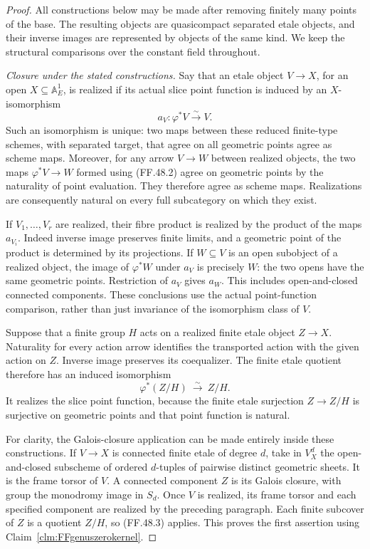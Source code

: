 \begin{proof}
All constructions below may be made after removing
finitely many points of the base. The resulting objects
are quasicompact separated etale objects, and their
inverse images are represented by objects of the same
kind. We keep the structural comparisons over the
constant field throughout.

\emph{Closure under the stated constructions.}
Say that an etale object \(V\to X\), for an open
\(X\subseteq\mathbb A^1_E\), is realized if its
actual slice point function is induced by an
\(X\)-isomorphism
\[
                       a_V:\varphi^*V\xrightarrow{\sim}V.
                                                        \tag{FF.48.2}
\]
Such an isomorphism is unique: two maps between these
reduced finite-type schemes, with separated target, that
agree on all geometric points agree as scheme maps.
Moreover, for any arrow \(V\to W\) between realized
objects, the two maps \(\varphi^*V\to W\) formed
using (FF.48.2) agree on geometric points by the
naturality of point evaluation. They therefore agree
as scheme maps. Realizations are consequently natural
on every full subcategory on which they exist.

If \(V_1,\ldots,V_r\) are realized, their fibre
product is realized by the product of the maps
\(a_{V_i}\). Indeed inverse image preserves finite
limits, and a geometric point of the product is
determined by its projections. If \(W\subseteq V\)
is an open subobject of a realized object, the image of
\(\varphi^*W\) under \(a_V\) is precisely \(W\):
the two opens have the same geometric points. Restriction
of \(a_V\) gives \(a_W\). This includes open-and-closed
connected components. These conclusions use the actual
point-function comparison, rather than just invariance
of the isomorphism class of \(V\).

Suppose that a finite group \(H\) acts on a realized
finite etale object \(Z\to X\). Naturality for every
action arrow identifies the transported action with the
given action on \(Z\). Inverse image preserves its
coequalizer. The finite etale quotient therefore has
an induced isomorphism
\[
             \varphi^*(Z/H)\ \xrightarrow{\sim}\ Z/H.
                                                        \tag{FF.48.3}
\]
It realizes the slice point function, because the finite
etale surjection \(Z\to Z/H\) is surjective on
geometric points and that point function is natural.

For clarity, the Galois-closure application can be made
entirely inside these constructions. If \(V\to X\)
is connected finite etale of degree \(d\), take in
\(V^d_X\) the open-and-closed subscheme of ordered
\(d\)-tuples of pairwise distinct geometric sheets.
It is the frame torsor of \(V\). A connected component
\(Z\) is its Galois closure, with group the monodromy
image in \(S_d\). Once \(V\) is realized, its frame
torsor and each specified component are realized by
the preceding paragraph. Each finite subcover of
\(Z\) is a quotient \(Z/H\), so (FF.48.3) applies.
This proves the first assertion using
Claim~\ref{clm:FFgenuszerokernel}.


\end{proof}
